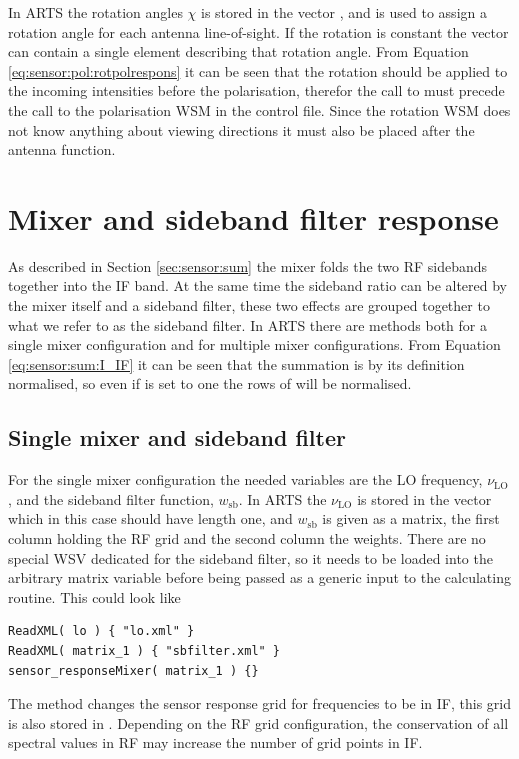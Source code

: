 In ARTS the rotation angles $\chi$ is stored in the vector
, and is used to assign a rotation angle for
each antenna line-of-sight. If the rotation is constant the
 vector can contain a single element describing
that rotation angle. From Equation \ref{eq:sensor:pol:rotpolrespons}
it can be seen that the rotation should be applied to the incoming
intensities before the polarisation, therefor the call to
 must precede the call to the
polarisation WSM in the control file. Since the rotation WSM does not
know anything about viewing directions it must also be placed after
the antenna function.


\section{Mixer and sideband filter response}
As described in Section \ref{sec:sensor:sum} the mixer folds the two
RF sidebands together into the IF band. At the same time the sideband
ratio can be altered by the mixer itself and a sideband filter, these
two effects are grouped together to what we refer to as the sideband
filter. In ARTS there are methods both for a single mixer
configuration and for multiple mixer configurations. From
Equation \ref{eq:sensor:sum:I_IF} it can be seen that the summation is
by its definition normalised, so even if  is
set to one the rows of  will be normalised.

\subsection{Single mixer and sideband filter}
For the single mixer configuration the needed variables are the LO
frequency, $\nu_\mathrm{LO}$, and the sideband filter function,
$w_\mathrm{sb}$. In ARTS the $\nu_\mathrm{LO}$ is stored in the vector
 which in this case should have length one, and
$w_\mathrm{sb}$ is given as a matrix, the first column holding the RF
grid and the second column the weights. There are no special WSV
dedicated for the sideband filter, so it needs to be loaded into the
arbitrary matrix variable  before being passed as
a generic input to the calculating routine. This could look like
\begin{verbatim}
ReadXML( lo ) { "lo.xml" }
ReadXML( matrix_1 ) { "sbfilter.xml" }
sensor_responseMixer( matrix_1 ) {}
\end{verbatim}
The method  changes the sensor
response grid for frequencies to be in IF, this grid is also stored in
. Depending on the RF grid configuration, the
conservation of all spectral values in RF may increase the number of
grid points in IF.

